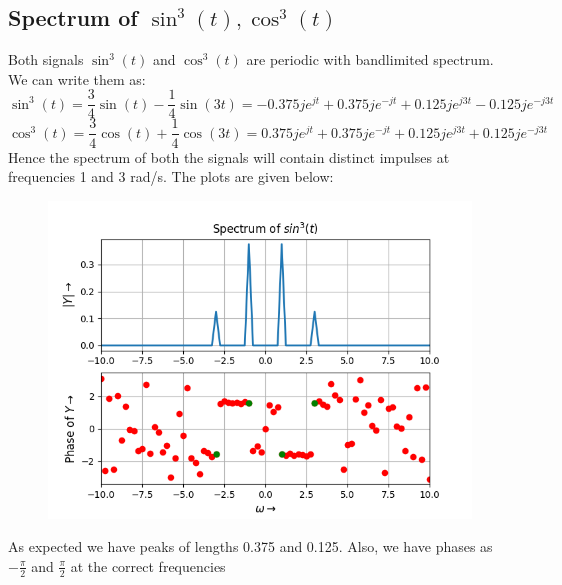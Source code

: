 \documentclass[12pt, a4paper]{article}
\begin{document}
\subsection{Spectrum of $\sin^{3}(t), \cos^{3}(t)$}
Both signals $\sin^{3}(t)$ and $\cos^{3}(t)$ are periodic with bandlimited spectrum. We can write them as:
\begin{equation*}
    \sin^{3}(t) = \frac{3}{4}\sin(t) - \frac{1}{4}\sin(3t) = -0.375je^{jt} + 0.375je^{-jt} + 0.125je^{j3t} - 0.125je^{-j3t}
\end{equation*}
\begin{equation*}
    \cos^{3}(t) = \frac{3}{4}\cos(t) + \frac{1}{4}\cos(3t) = 0.375je^{jt} + 0.375je^{-jt} + 0.125je^{j3t} + 0.125je^{-j3t}    
\end{equation*}
Hence the spectrum of both the signals will contain distinct impulses at frequencies 1 and 3 rad/s. The plots are given below:
\vspace*{-0.5cm}
\begin{figure}[H]
    \centering
    \includegraphics[scale = 0.8]{Figure_5.png}
    \label{fig:sample}
\end{figure}
\begin{center}
    As expected we have peaks of lengths 0.375 and 0.125. Also, we have phases as $-\frac{\pi}{2}$ and $\frac{\pi}{2}$ at the correct frequencies
\end{center}
\vspace*{-0.5cm}
\end{document}
